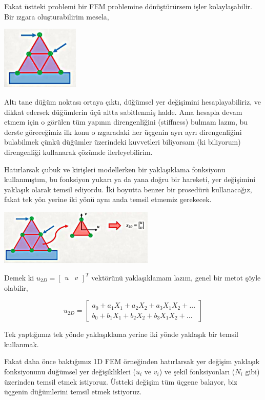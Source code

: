 \documentclass[12pt,fleqn]{article}\usepackage{../../common}
\begin{document}
Fakat üstteki problemi bir FEM problemine dönüştürürsem işler
kolaylaşabilir. Bir ızgara oluşturabilirim mesela,

\includegraphics[width=10em]{compscieng_bpp45fem3_02.jpg}

Altı tane düğüm noktası ortaya çıktı, düğümsel yer değişimini hesaplayabiliriz,
ve dikkat edersek düğümlerin üçü altta sabitlenmiş halde. Ama hesapla devam
etmem için o görülen tüm yapının direngenliğini (stiffness) bulmam lazım, bu
derste göreceğimiz ilk konu o ızgaradaki her üçgenin ayrı ayrı direngenliğini
bulabilmek çünkü düğümler üzerindeki kuvvetleri biliyorsam (ki biliyorum)
direngenliği kullanarak çözümde ilerleyebilirim.

Hatırlarsak çubuk ve kirişleri modellerken bir yaklaşıklama fonksiyonu
kullanmıştım, bu fonksiyon yukarı ya da yana doğru bir hareketi, yer değişimini
yaklaşık olarak temsil ediyordu. İki boyutta benzer bir prosedürü kullanacağız,
fakat tek yön yerine iki yönü aynı anda temsil etmemiz gerekecek.

\includegraphics[width=20em]{compscieng_bpp45fem3_03.jpg}

Demek ki $u_{2D} = [\begin{array}{cc} u & v \end{array}]^T$ vektörünü
yaklaşıklamam lazım, genel bir metot şöyle olabilir,

$$
u_{2D} = \left[\begin{array}{c}
a_0 + a_1 X_1 + a_2 X_2 + a_3 X_1 X_2 + ...\\
b_0 + b_1 X_1 + b_2 X_2 + b_3 X_1 X_2 + ...
\end{array}\right]
$$

Tek yaptığımız tek yönde yaklaşıklama yerine iki yönde yaklaşık bir temsil
kullanmak. 

Fakat daha önce baktığımız 1D FEM örneğinden hatırlarsak yer değişim yaklaşık
fonksiyonunu düğümsel yer değişiklikleri ($u_i$ ve $v_i$) ve şekil fonksiyonları
($N_i$ gibi) üzerinden temsil etmek istiyoruz. Üstteki değişim tüm üçgene
bakıyor, biz üçgenin düğümlerini temsil etmek istiyoruz. 
\end{document}
